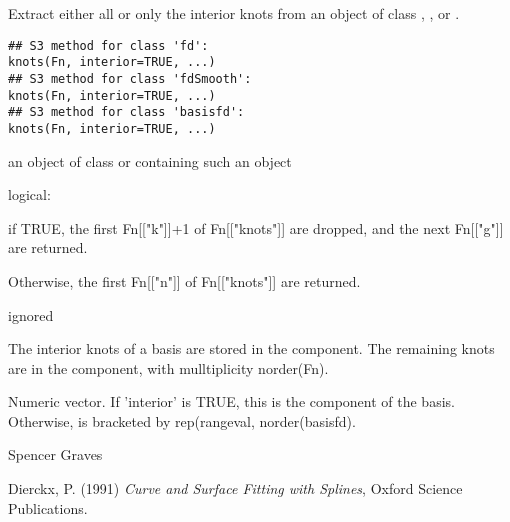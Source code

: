 \documentclass{article}
\begin{document}
\begin{Description}\relax
Extract either all or only the interior knots from an object of class
, , or .
\end{Description}
\begin{Usage}
\begin{verbatim}
## S3 method for class 'fd':
knots(Fn, interior=TRUE, ...)
## S3 method for class 'fdSmooth':
knots(Fn, interior=TRUE, ...)
## S3 method for class 'basisfd':
knots(Fn, interior=TRUE, ...)
\end{verbatim}
\end{Usage}
\begin{Arguments}
\begin{ldescription}
\item[\code{Fn}] an object of class  or containing such an object 

\item[\code{interior}] logical:

if TRUE, the first Fn[["k"]]+1 of Fn[["knots"]] are dropped, and the
next Fn[["g"]] are returned.

Otherwise, the first Fn[["n"]] of Fn[["knots"]] are returned.  

\item[\code{...}] ignored
\end{ldescription}
\end{Arguments}
\begin{Details}\relax
The interior knots of a  basis are stored in the
 component.  The remaining knots are in the
 component, with mulltiplicity norder(Fn).
\end{Details}
\begin{Value}
Numeric vector.  If 'interior' is TRUE, this is the 
component of the  basis.  Otherwise,  is
bracketed by rep(rangeval, norder(basisfd).
\end{Value}
\begin{Author}\relax
Spencer Graves
\end{Author}
\begin{References}\relax
Dierckx, P. (1991) \emph{Curve and Surface Fitting with Splines},
Oxford Science Publications.
\end{References}
\end{document}
